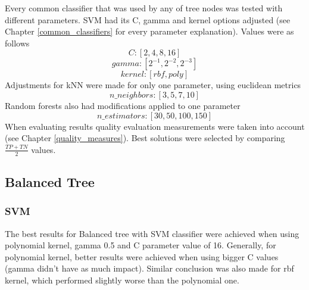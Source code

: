 Every common classifier that was used by any of tree nodes was tested with different parameters. SVM had its C, gamma and kernel options adjusted (see Chapter \ref{common_classifiers} for every parameter explanation). Values were as follows \[ C: [ 2, 4, 8, 16 ] \] \[ gamma: [ 2^{-1}, 2^{-2}, 2^{-3} ] \]  \[ kernel: [ rbf, poly ] \] 
Adjustments for kNN were made for only one parameter, using euclidean metrics \[ n\_neighbors: [ 3, 5, 7, 10 ] \]
Random forests also had modifications applied to one parameter \[ n\_estimators: [ 30, 50, 100, 150 ] \]
When evaluating results quality evaluation measurements were taken into account (see Chapter \ref{quality_measures}). Best solutions were selected by comparing $ \frac{TP + TN}{2} $ values.

\subsection{Balanced Tree}

\subsubsection{SVM}

The best results for Balanced tree with SVM classifier were achieved when using polynomial kernel, gamma 0.5 and C parameter value of 16. Generally, for polynomial kernel, better results were achieved when using bigger C values (gamma didn't have as much impact). Similar conclusion was also made for rbf kernel, which performed slightly worse than the polynomial one.

